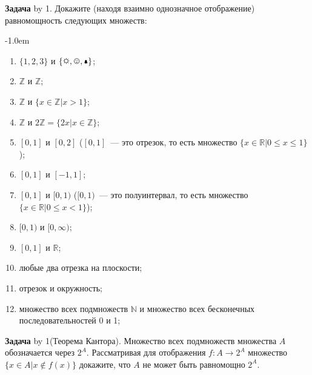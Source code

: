 \documentclass[a4paper,10pt]{article}
\def\problem{\textbf{Задача \the\problemnum}\advance\problemnum by 1}
\begin{document}
\problem. Докажите (находя взаимно однозначное отображение) равномощность следующих множеств: \par\kern-1.0em
\begin{multicols}{2}
	\begin{enumerate}[label=(\arabic*)\,]
		\item $\{1,2,3\}$ и $\{\sun,\smiley,\bell\}$;
		\item $\mathbb Z$ и $\mathbb Z$;
		\item $\mathbb Z$ и $\{x\in\mathbb Z|x>1\}$;
		\item $\mathbb Z$ и $2\mathbb Z=\{2x|x\in\mathbb Z\}$;
		\item $[0,1]$ и $[0,2]$ ($[0,1]$~--- это отрезок, то есть множество $\{x\in \mathbb R|0\leqslant x\leqslant 1\}$);
		\item $[0,1]$ и $[-1,1]$;
		\item $[0,1]$ и $[0,1)$ ($[0,1)$~--- это полуинтервал, то есть множество $\{x\in \mathbb R|0\leqslant x<1\}$);
		\item $[0,1)$ и $[0,\infty)$;
		\item $[0,1]$ и $\mathbb R$;
		\item любые два отрезка на плоскости;
		\item отрезок и окружность;
		\item множество всех подмножеств $\mathbb N$ и множество всех бесконечных последовательностей 0 и 1;
	\end{enumerate}
\end{multicols}

\problem (Теорема Кантора). Множество всех подмножеств множества $A$ обозначается через $2^A$. Рассматривая для отображения $f:A\to 2^A$ множество $\{x\in A|x\not\in f(x)\}$ докажите, что $A$ не может быть равномощно $2^A$.
\end{document}
